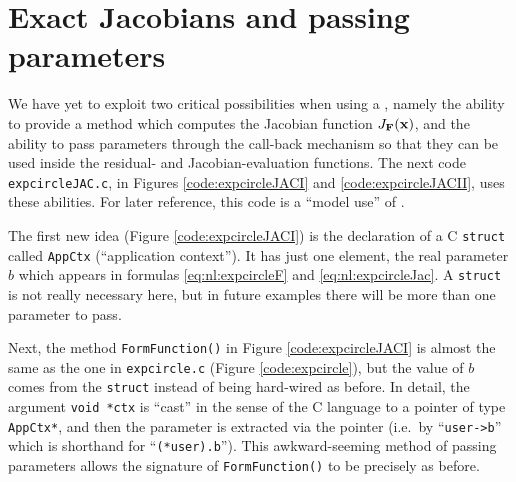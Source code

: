 \section{Exact Jacobians and passing parameters}

We have yet to exploit two critical possibilities when using a \pSNES, namely the ability to provide a method which computes the Jacobian function $J_{\mathbf{F}}(\mathbf{x})$, and the ability to pass parameters through the call-back mechanism so that they can be used inside the residual- and Jacobian-evaluation functions.  The next code \texttt{expcircleJAC.c}, in Figures \ref{code:expcircleJACI} and \ref{code:expcircleJACII}, uses these abilities.  For later reference, this code is a ``model use'' of \pSNES.

\medskip
{}

The first new idea (Figure \ref{code:expcircleJACI}) is the declaration of a C \texttt{struct} called \texttt{AppCtx} (``application context'').  It has just one element, the real parameter $b$ which appears in formulas \eqref{eq:nl:expcircleF} and \eqref{eq:nl:expcircleJac}.  A \texttt{struct} is not really necessary here, but in future examples there will be more than one parameter to pass.


Next, the method \texttt{FormFunction()} in Figure \ref{code:expcircleJACI} is almost the same as the one in \texttt{expcircle.c} (Figure \ref{code:expcircle}), but the value of $b$ comes from the \texttt{struct} instead of being hard-wired as before.  In detail, the argument \texttt{void *ctx} is ``cast'' in the sense of the C language \citep{KernighanRitchie1988} to a pointer of type \texttt{AppCtx*}, and then the parameter is extracted via the pointer (i.e.~by ``\texttt{user->b}'' which is shorthand for ``\texttt{(*user).b}'').  This awkward-seeming method of passing parameters allows the signature of \texttt{FormFunction()} to be precisely as before.

